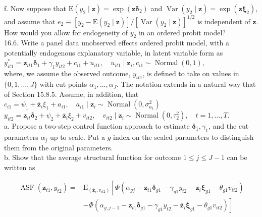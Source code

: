 \documentclass[10pt]{article}
\begin{document}
f. Now suppose that $\mathrm{E}\left(y_{2} \mid \mathbf{z}\right)=\exp \left(\mathbf{z} \boldsymbol{\delta}_{2}\right)$ and $\operatorname{Var}\left(y_{2} \mid \mathbf{z}\right)=\exp \left(\mathbf{z} \boldsymbol{\xi}_{2}\right)$, and assume that $e_{2} \equiv\left[y_{2}-\mathrm{E}\left(y_{2} \mid \mathbf{z}\right)\right] /\left[\operatorname{Var}\left(y_{2} \mid \mathbf{z}\right)\right]^{1 / 2}$ is independent of $\mathbf{z}$. How would you allow for endogeneity of $y_{2}$ in an ordered probit model?\\
16.6. Write a panel data unobserved effects ordered probit model, with a potentially endogenous explanatory variable, in latent variable form as\\
$y_{i t 1}^{*}=\mathbf{z}_{i t 1} \boldsymbol{\delta}_{1}+\gamma_{1} y_{i t 2}+c_{i 1}+u_{i t 1}, \quad u_{i t 1} \mid \mathbf{z}_{i}, c_{i 1} \sim \operatorname{Normal}(0,1)$,\\
where, we assume the observed outcome, $y_{i t 1}$, is defined to take on values in $\{0,1, \ldots, J\}$ with cut points $\alpha_{1}, \ldots, \alpha_{J}$. The notation extends in a natural way that of Section 15.8.5. Assume, in addition, that\\
$c_{i 1}=\psi_{1}+\overline{\mathbf{z}}_{i} \xi_{1}+a_{i 1}, \quad a_{i 1} \mid \mathbf{z}_{i} \sim \operatorname{Normal}\left(0, \sigma_{a_{1}}^{2}\right)$\\
$y_{i t 2}=\mathbf{z}_{i t} \boldsymbol{\delta}_{2}+\psi_{2}+\overline{\mathbf{z}}_{i} \xi_{2}+v_{i t 2}, \quad v_{i t 2} \mid \mathbf{z}_{i} \sim \operatorname{Normal}\left(0, \tau_{2}^{2}\right), \quad t=1, \ldots, T$.\\
a. Propose a two-step control function approach to estimate $\boldsymbol{\delta}_{1}, \gamma_{1}$, and the cut parameters $\alpha_{j}$ up to scale. Put a $g$ index on the scaled parameters to distinguish them from the original parameters.\\
b. Show that the average structural function for outcome $1 \leq j \leq J-1$ can be written as

$$
\begin{aligned}
\operatorname{ASF}\left(\mathbf{z}_{t 1}, y_{t 2}\right)= & \mathrm{E}_{\left(\overline{\mathbf{z}}_{i}, v_{i t 2}\right)}\left[\Phi\left(\alpha_{g j}-\mathbf{z}_{t 1} \boldsymbol{\delta}_{g 1}-\gamma_{g 1} y_{t 2}-\overline{\mathbf{z}}_{i} \boldsymbol{\xi}_{g 1}-\theta_{g 1} v_{i t 2}\right)\right. \\
& \left.-\Phi\left(\alpha_{g, j-1}-\mathbf{z}_{t 1} \boldsymbol{\delta}_{g 1}-\gamma_{g 1} y_{t 2}-\overline{\mathbf{z}}_{i} \boldsymbol{\xi}_{g 1}-\theta_{g 1} v_{i t 2}\right)\right]
\end{aligned}
$$
\end{document}

